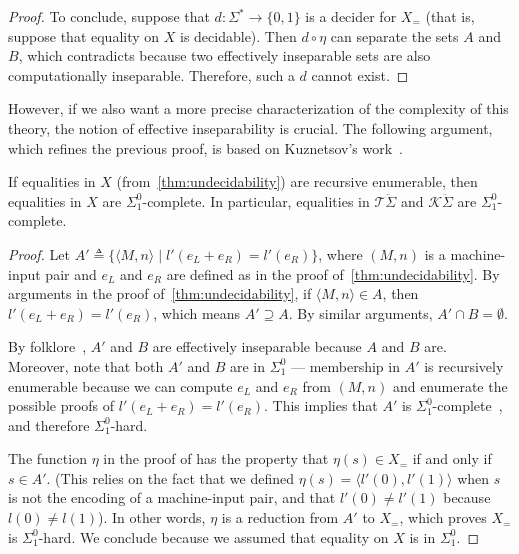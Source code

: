 \documentclass[a4paper,UKenglish,cleveref, autoref, thm-restate]{lipics-v2021}
\begin{document}
\begin{proof}
  To conclude, suppose that $d : \Sigma^* \to \{0,1\}$ is a decider for $X_{=}$
  (that is, suppose that equality on $X$ is decidable).  Then $d \circ \eta$ can
  separate the sets $A$ and $B$, which contradicts
   because two effectively inseparable sets are
  also computationally inseparable. Therefore, such a $d$ cannot exist.
\end{proof}

However, if we also want a more precise characterization of the complexity of
this theory, the notion of effective inseparability is crucial.  The following
argument, which refines the previous proof, is based on Kuznetsov's
work~\cite{Kuznetsov23}.

\begin{theorem}[Complexity]
  If equalities in \(X\) (from~\cref{thm:undecidability}) are recursive
  enumerable, then equalities in \(X\) are \(\Sigma^0_1\)-complete.  In
  particular, equalities in $\mathcal{T}\ddot{ \Sigma }$ and
  $\mathcal{K}\ddot{ \Sigma }$ are \(\Sigma^0_1\)-complete.
\end{theorem}

\begin{proof}
  Let $A' \triangleq \{ \langle M, n \rangle \mid l'(e_L+e_R) = l'(e_R) \}$,
  where $(M,n)$ is a machine-input pair and $e_L$ and $e_R$ are defined as in
  the proof of~\cref{thm:undecidability}.  By arguments in the proof
  of~\cref{thm:undecidability}, if $\langle M, n\rangle \in A$, then
  \(l'(e_L+e_R) = l'(e_R)\), which means \(A' \supseteq A\).  By similar
  arguments, $A' \cap B = \emptyset$.

  By folklore~\cite[Proposition 9]{Kuznetsov23}, \(A'\) and \(B\) are
  effectively inseparable because $A$ and $B$ are.  Moreover, note that both
  \(A'\) and \(B\) are in \(\Sigma^0_1\) --- membership in \(A'\) is recursively
  enumerable because we can compute $e_L$ and $e_R$ from $(M,n)$ and enumerate
  the possible proofs of $l'(e_L+e_R) = l'(e_R)$.  This implies that \(A'\) is
  \(\Sigma^0_1\)-complete~\cite[Proposition 7]{Kuznetsov23}, and therefore
  \(\Sigma^0_1\)-hard.

  The function $\eta$ in the proof of  has the property
  that $\eta(s) \in X_{=}$ if and only if $s \in A'$. (This relies on the fact
  that we defined $\eta(s) = \langle l'(0), l'(1)\rangle$ when $s$ is not the
  encoding of a machine-input pair, and that $l'(0) \neq l'(1)$ because
  $l(0) \neq l(1)$).  In other words, $\eta$ is a reduction from $A'$ to
  $X_{=}$, which proves $X_{=}$ is $\Sigma^0_1$-hard.  We conclude because we
  assumed that equality on $X$ is in $\Sigma^0_1$.
\end{proof}
\end{document}
